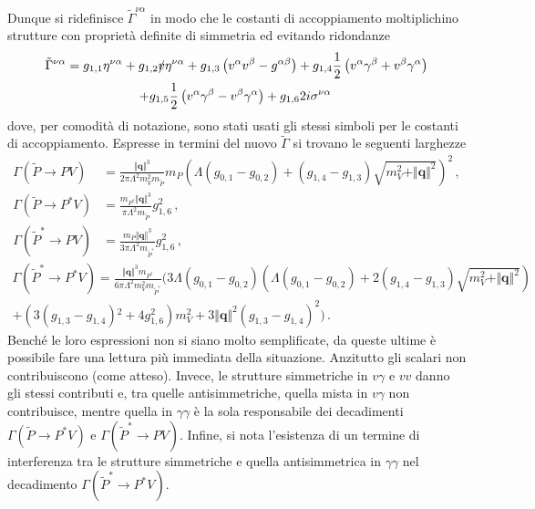 \documentclass{article}
\begin{document}
Dunque si ridefinisce $\tilde{\Gamma}^{\nu \alpha}$ in modo che le costanti di accoppiamento moltiplichino strutture con proprietà definite di simmetria ed evitando ridondanze
\begin{multline}
  \tilde{\Gamma}^{\nu \alpha} = g_{1,1} \eta^{\nu \alpha} + g_{1,2} \slashed{v} \eta^{\nu \alpha} + g_{1,3} \left( v^\alpha v^\beta - g^{\alpha \beta} \right) + g_{1,4} \frac{1}{2} \left( v^\alpha \gamma^\beta + v^\beta \gamma^\alpha \right) \\ + g_{1,5} \frac{1}{2} \left( v^\alpha \gamma^\beta - v^\beta \gamma^\alpha \right) + g_{1,6} 2 i \sigma^{\nu \alpha}  \, 
\end{multline}
dove, per comodità di notazione, sono stati usati gli stessi simboli per le costanti di accoppiamento.
Espresse in termini del nuovo $\tilde{\Gamma}$ si trovano le seguenti larghezze
\begin{align}
  \Gamma\left( \tilde{P} \to P V \right) &= \frac{\Vert\mathbf{q}\Vert^3}{2 \pi \Lambda^2 m_V^2 m_{\tilde{P}}} m_P \left(\Lambda \left(g_{0,1}-g_{0,2}\right)+\left(g_{1,4}-g_{1,3}\right) \sqrt{m_V^2+\Vert\mathbf{q}\Vert^2}\right)^2 \, , \\
  \Gamma\left( \tilde{P} \to P^* V \right) &= \frac{m_{P^*} \Vert \mathbf{q} \Vert^3}{\pi  \Lambda ^2 m_{\tilde{P}}} g_{1,6}^2 \, , \\
  \Gamma\left( \tilde{P}^* \to P V \right) &= \frac{m_P \Vert \mathbf{q} \Vert^3}{3 \pi  \Lambda ^2 m_{\tilde{P}^*}} g_{1,6}^2 \, ,
\end{align}
\begin{multline}
  \Gamma\left( \tilde{P}^* \to P^* V \right) = \frac{\Vert\mathbf{q}\Vert^3 m_{P^*}}{6 \pi \Lambda^2 m_V^2 m_{\tilde{P}^*}} \Bigg(3 \Lambda \left(g_{0,1}-g_{0,2}\right) \left(\Lambda \left( g_{0,1}-g_{0,2}\right)+2 \left(g_{1,4}-g_{1,3}\right) \sqrt{m_V^2+\Vert\mathbf{q}\Vert^2}\right) \\
  +\left(3 \left(g_{1,3}-g_{1,4}\right){}^2+4 g_{1,6}^2\right) m_V^2+3 \Vert\mathbf{q}\Vert^2 \left(g_{1,3}-g_{1,4}\right)^2\Bigg)\, .
\end{multline}
Benché le loro espressioni non si siano molto semplificate, da queste ultime è possibile fare una lettura più immediata della situazione. Anzitutto gli scalari non contribuiscono (come atteso). Invece, le strutture simmetriche in $v \gamma$ e $v v$ danno gli stessi contributi e, tra quelle antisimmetriche, quella mista in $v \gamma$ non contribuisce, mentre quella in $\gamma \gamma$ è la sola responsabile dei decadimenti $\Gamma\left( \tilde{P} \to P^* V \right)$ e $\Gamma\left( \tilde{P}^* \to P V \right)$. Infine, si nota l'esistenza di un termine di interferenza tra le strutture simmetriche e quella antisimmetrica in $\gamma \gamma$ nel decadimento $\Gamma\left( \tilde{P}^* \to P^* V \right)$.
\end{document}
